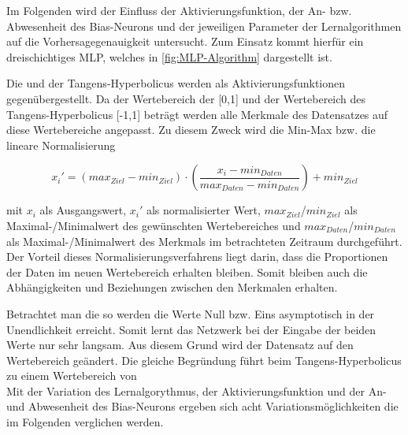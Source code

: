 Im Folgenden wird der Einfluss der Aktivierungsfunktion, der An- bzw. Abwesenheit des Bias-Neurons und der jeweiligen Parameter der Lernalgorithmen auf die Vorhersagegenauigkeit untersucht. Zum Einsatz kommt hierfür ein dreischichtiges MLP, welches in \autoref{fig:MLP-Algorithm} dargestellt ist. 

Die  und der Tangens-Hyperbolicus werden als Aktivierungsfunktionen gegenübergestellt. Da der Wertebereich der  [0,1] und der Wertebereich des Tangens-Hyperbolicus [-1,1] beträgt werden alle Merkmale des Datensatzes auf diese Wertebereiche angepasst. Zu diesem Zweck wird die Min-Max bzw. die lineare Normalisierung

\begin{equation}
x_i'=(max_{Ziel} - min_{Ziel}) \cdot \left ( \frac{x_i-min_{Daten}}{max_{Daten}-min_{Daten}} \right ) + min_{Ziel}
\label{gl:norm}
\end{equation}

mit $x_i$ als Ausgangswert, $x_i'$ als normalisierter Wert, $max_{Ziel}$/$min_{Ziel}$ als Maximal-/Minimalwert des gewünschten Wertebereiches und $max_{Daten}$/$min_{Daten}$ als Maximal-/Minimalwert des Merkmals im betrachteten Zeitraum durchgeführt. Der Vorteil dieses Normalisierungsverfahrens liegt darin, dass die Proportionen der Daten im neuen Wertebereich erhalten bleiben. Somit bleiben auch die Abhängigkeiten und Beziehungen zwischen den Merkmalen erhalten. 

Betrachtet man die  so werden die Werte Null bzw. Eins asymptotisch in der Unendlichkeit erreicht. Somit lernt das Netzwerk bei der Eingabe der beiden Werte nur sehr langsam. Aus diesem Grund wird der Datensatz auf den Wertebereich \farbig{[0.1,0.9]} geändert. Die gleiche Begründung führt beim Tangens-Hyperbolicus zu einem Wertebereich von \farbig{[-0.9,0.9]}
\\
Mit der Variation des Lernalgorythmus, der Aktivierungsfunktion und der An- und Abwesenheit des Bias-Neurons ergeben sich acht Variationsmöglichkeiten die im Folgenden verglichen werden.